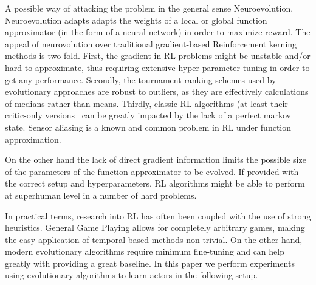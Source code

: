 \documentclass[conference]{IEEEtran}
\begin{document}
A possible way of attacking the problem in the general sense Neuroevolution\cite{neurocrap}. Neuroevolution adapts adapts the weights of a local or global function approximator (in the form of a neural network) in order to maximize reward. The appeal of neurovolution over traditional gradient-based Reinforcement kerning methods is two fold. First, the gradient in RL problems might be unstable and/or hard to approximate, thus requiring extensive hyper-parameter tuning in order to get any performance. Secondly, the tournament-ranking schemes used by evolutionary approaches are robust to outliers, as they are effectively calculations of medians rather than means. Thirdly, classic RL algorithms (at least their critic-only versions~\cite{jakollacrap} can be greatly impacted by the lack of a perfect markov state. Sensor aliasing is a known and common problem in RL under function approximation. 

On the other hand the lack of direct gradient information limits the possible size of the parameters of the function approximator to be evolved. If provided with the correct setup and hyperparameters, RL algorithms might be able to perform at superhuman level in a number of hard problems. 

In practical terms, research into RL has often been coupled with the use of strong heuristics. General Game Playing allows for completely arbitrary games, making the easy application of temporal based methods non-trivial. On the other hand, modern evolutionary algorithms require minimum fine-tuning and can help greatly with providing a great baseline. In this paper we perform experiments using evolutionary algorithms to learn actors in the following setup. 
\end{document}
